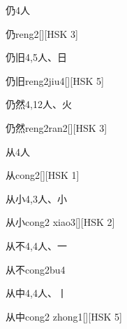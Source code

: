 \begin{entry}{仍}{4}{⼈}
  \begin{phonetics}{仍}{reng2}[][HSK 3]
  \end{phonetics}
\end{entry}

\begin{entry}{仍旧}{4,5}{⼈、⽇}
  \begin{phonetics}{仍旧}{reng2jiu4}[][HSK 5]
  \end{phonetics}
\end{entry}

\begin{entry}{仍然}{4,12}{⼈、⽕}
  \begin{phonetics}{仍然}{reng2ran2}[][HSK 3]
  \end{phonetics}
\end{entry}

\begin{entry}{从}{4}{⼈}
  \begin{phonetics}{从}{cong2}[][HSK 1]
  \end{phonetics}
\end{entry}

\begin{entry}{从小}{4,3}{⼈、⼩}
  \begin{phonetics}{从小}{cong2 xiao3}[][HSK 2]
  \end{phonetics}
\end{entry}

\begin{entry}{从不}{4,4}{⼈、⼀}
  \begin{phonetics}{从不}{cong2bu4}
  \end{phonetics}
\end{entry}

\begin{entry}{从中}{4,4}{⼈、⼁}
  \begin{phonetics}{从中}{cong2 zhong1}[][HSK 5]
  \end{phonetics}
\end{entry}

